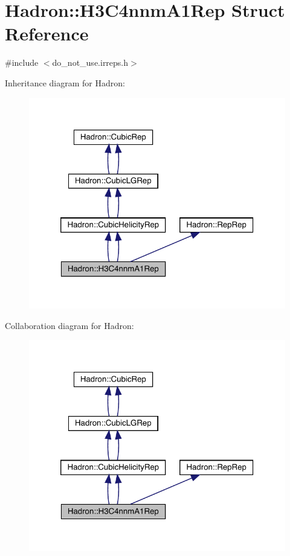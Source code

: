 \hypertarget{structHadron_1_1H3C4nnmA1Rep}{}\section{Hadron\+:\+:H3\+C4nnm\+A1\+Rep Struct Reference}
\label{structHadron_1_1H3C4nnmA1Rep}


{\ttfamily \#include $<$do\+\_\+not\+\_\+use.\+irreps.\+h$>$}



Inheritance diagram for Hadron\+:\nopagebreak
\begin{figure}[H]
\begin{center}
\leavevmode
\includegraphics[width=320pt]{df/d45/structHadron_1_1H3C4nnmA1Rep__inherit__graph}
\end{center}
\end{figure}


Collaboration diagram for Hadron\+:\nopagebreak
\begin{figure}[H]
\begin{center}
\leavevmode
\includegraphics[width=320pt]{d5/d3f/structHadron_1_1H3C4nnmA1Rep__coll__graph}
\end{center}
\end{figure}
